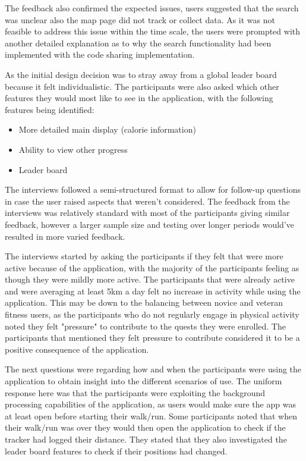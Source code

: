 \documentclass{l4proj}
\begin{document}
The feedback also confirmed the expected issues, users suggested that the search was unclear also the map page did not track or collect data. As it was not feasible to address this issue within the time scale, the users were prompted with another detailed explanation as to why the search functionality had been implemented with the code sharing implementation. 

 As the initial design decision was to stray away from a global leader board because it felt individualistic. The participants were also asked which other features they would most like to see in the application, with the following features being identified: 

\begin{itemize}
\item  More detailed main display (calorie information) 
\item Ability to view other progress
\item Leader board 
\end{itemize}


The interviews followed a semi-structured format to allow for follow-up questions in case the user raised aspects that weren't considered. The feedback from the interviews was relatively standard with most of the participants giving similar feedback, however a larger sample size and testing over longer periods would've resulted in more varied feedback.

The interviews started by asking the participants if they felt that were more active because of the application, with the majority of the participants feeling as though they were mildly more active. The participants that were already active and were averaging at least 5km a day felt no increase in activity while using the application. This may be down to the balancing between novice and veteran fitness users, as the participants who do not regularly engage in physical activity noted they felt "pressure" to contribute to the quests they were enrolled. The participants that mentioned they felt pressure to contribute considered it to be a positive consequence of the application.  

The next questions were regarding how and when the participants were using the application to obtain insight into the different scenarios of use. The uniform response here was that the participants were exploiting the background processing capabilities of the application, as users would make sure the app was at least open before starting their walk/run. Some participants noted that when their walk/run was over they would then open the application to check if the tracker had logged their distance. They stated that they also investigated the leader board features to check if their positions had changed. 
\end{document}
